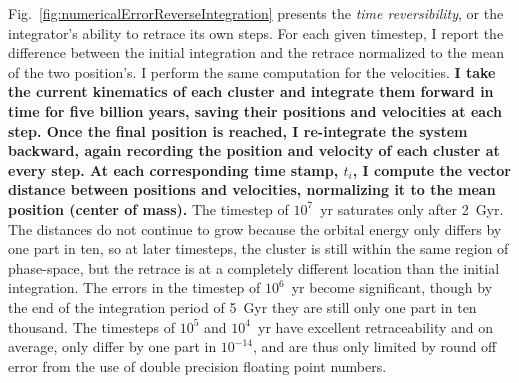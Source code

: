         Fig.~\ref{fig:numericalErrorReverseIntegration} presents the \textit{time reversibility}, or the integrator's ability to retrace its own steps. For each given timestep, I report the difference between the initial integration and the retrace normalized to the mean of the two position's. I perform the same computation for the velocities. \textbf{I take the current kinematics of each cluster and integrate them forward in time for five billion years, saving their positions and velocities at each step. Once the final position is reached, I re-integrate the system backward, again recording the position and velocity of each cluster at every step. At each corresponding time stamp, $t_i$, I compute the vector distance between positions and velocities, normalizing it to the mean position (center of mass).} The timestep of $10^7$~yr saturates only after 2~Gyr. The distances do not continue to grow because the orbital energy only differs by one part in ten, so at later timesteps, the cluster is still within the same region of phase-space, but the retrace is at a completely different location than the initial integration. The errors in the timestep of $10^6$~yr become significant, though by the end of the integration period of 5~Gyr they are still only one part in ten thousand. The timesteps of $10^5$ and $10^4$~yr have excellent retraceability and on average, only differ by one part in $10^{-14}$, and are thus only limited by round off error from the use of double precision floating point numbers.

